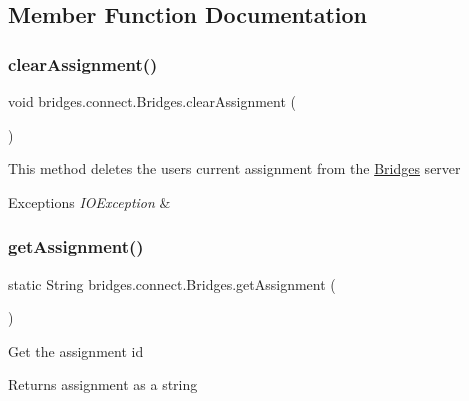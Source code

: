 \subsection{Member Function Documentation}
\mbox{\label{classbridges_1_1connect_1_1_bridges_ad79081ca241e5bcb77b1ed52a09fdd39}} 
\subsubsection{\texorpdfstring{clearAssignment()}{clearAssignment()}}
{\footnotesize\ttfamily void bridges.\+connect.\+Bridges.\+clear\+Assignment (\begin{DoxyParamCaption}{ }\end{DoxyParamCaption})}

This method deletes the user\textquotesingle{}s current assignment from the \mbox{\hyperlink{classbridges_1_1connect_1_1_bridges}{Bridges}} server


\begin{DoxyExceptions}{Exceptions}
{\em I\+O\+Exception} & \\
\hline
\end{DoxyExceptions}
\mbox{\label{classbridges_1_1connect_1_1_bridges_af049c06c532987eb616156fb16ea2f43}} 
\subsubsection{\texorpdfstring{getAssignment()}{getAssignment()}}
{\footnotesize\ttfamily static String bridges.\+connect.\+Bridges.\+get\+Assignment (\begin{DoxyParamCaption}{ }\end{DoxyParamCaption})\hspace{0.3cm}{\ttfamily [static]}}

Get the assignment id

\begin{DoxyReturn}{Returns}
assignment as a string 
\end{DoxyReturn}
\mbox{\label{classbridges_1_1connect_1_1_bridges_ac13ed456687540b57c138adb11735d95}} 
